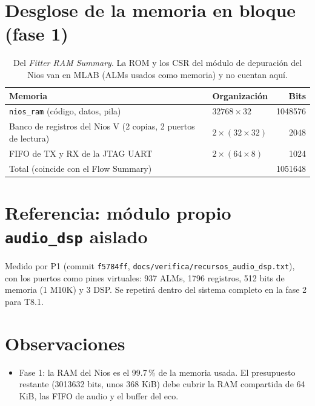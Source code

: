 \documentclass[11pt]{article}
\begin{document}
\section{Desglose de la memoria en bloque (fase 1)}

\begin{table}[h]
\centering
\small
\begin{tabular}{@{}l l r@{}}
\toprule
Memoria & Organización & Bits \\
\midrule
\texttt{nios\_ram} (código, datos, pila) & $32768 \times 32$ & \num{1048576} \\
Banco de registros del Nios V (2 copias, 2 puertos de lectura) & $2 \times (32 \times 32)$ & \num{2048} \\
FIFO de TX y RX de la JTAG UART & $2 \times (64 \times 8)$ & \num{1024} \\
\midrule
Total (coincide con el Flow Summary) & & \num{1051648} \\
\bottomrule
\end{tabular}
\caption{Del \emph{Fitter RAM Summary}. La ROM y los CSR del módulo de depuración
del Nios van en MLAB (ALMs usados como memoria) y no cuentan aquí.}
\end{table}

\section{Referencia: módulo propio \texttt{audio\_dsp} aislado}
Medido por P1 (commit \texttt{f5784ff}, \texttt{docs/verifica/recursos\_audio\_dsp.txt}),
con los puertos como pines virtuales: \num{937} ALMs, \num{1796} registros,
512 bits de memoria (1 M10K) y 3 DSP. Se repetirá dentro del sistema completo
en la fase 2 para T8.1.

\section{Observaciones}
\begin{itemize}
  \item Fase 1: la RAM del Nios es el 99.7\,\% de la memoria usada. El presupuesto
        restante (\num{3013632} bits, unos 368 KiB) debe cubrir la RAM compartida
        de 64 KiB, las FIFO de audio y el buffer del eco.
\end{itemize}
\end{document}

